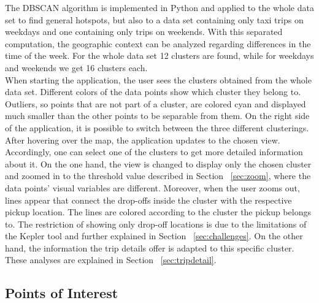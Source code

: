 \documentclass[sigconf, authorversion, nonacm=true]{acmart}
\begin{document}
The DBSCAN algorithm is implemented in Python and applied to the whole data set to find general hotspots, but also to a data set containing only taxi trips on weekdays and one containing only trips on weekends. With this separated computation, the geographic context can be analyzed regarding differences in the time of the week. For the whole data set 12 clusters are found, while for weekdays and weekends we get 16 clusters each. \\
When starting the application, the user sees the clusters obtained from the whole data set. Different colors of the data points show which cluster they belong to. Outliers, so points that are not part of a cluster, are colored cyan and displayed much smaller than the other points to be separable from them. On the right side of the application, it is possible to switch between the three different clusterings. After hovering over the map, the application updates to the chosen view. Accordingly, one can select one of the clusters to get more detailed information about it. On the one hand, the view is changed to display only the chosen cluster and zoomed in to the threshold value described in Section ~\ref{sec:zoom}, where the data points' visual variables are different. Moreover, when the user zooms out, lines appear that connect the drop-offs inside the cluster with the respective pickup location. The lines are colored according to the cluster the pickup belongs to. The restriction of showing only drop-off locations is due to the limitations of the Kepler tool and further explained in Section ~\ref{sec:challenges}. On the other hand, the information the trip details offer is adapted to this specific cluster. These analyses are explained in Section ~\ref{sec:tripdetail}.






\subsection{Points of Interest}
\label{sec:poi}
\end{document}
